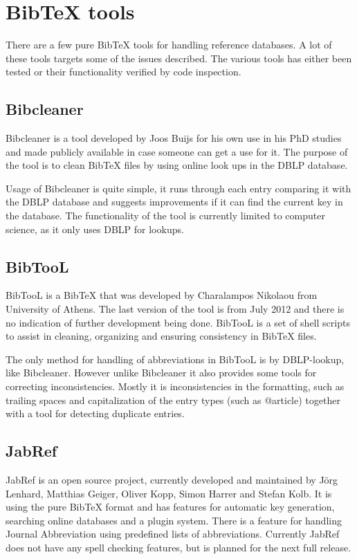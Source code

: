 \section{Bib{\TeX} tools}
\label{sec:bibtex_tools}
There are a few pure Bib{\TeX} tools for handling reference databases.
A lot of these tools targets some of the issues described.  The
various tools has either been tested or their functionality verified
by code inspection.

\subsection{Bibcleaner}
Bibcleaner is a tool developed by Joos Buijs for his own use in his
PhD studies and made publicly available in case someone can get a use
for it.  The purpose of the tool is to clean Bib{\TeX} files by using
online look ups in the DBLP database\cite{bibcleaner_question,
  bibcleaner_source}.

Usage of Bibcleaner is quite simple, it runs through each entry
comparing it with the DBLP database and suggests improvements if it
can find the current key in the database.  The functionality of the
tool is currently limited to computer science, as it only uses DBLP
for lookups\cite{bibcleaner_source}.

\subsection{BibTooL}
BibTooL is a Bib{\TeX} that was developed by Charalampos Nikolaou from
University of Athens.  The last version of the tool is from July 2012
and there is no indication of further development being done.  BibTooL
is a set of shell scripts to assist in cleaning, organizing and
ensuring consistency in Bib{\TeX} files\cite{bibtool_site}.

The only method for handling of abbreviations in BibTooL is by
DBLP-lookup, like Bibcleaner.  However unlike Bibcleaner it also
provides some tools for correcting inconsistencies.  Mostly it is
inconsistencies in the formatting, such as trailing spaces and
capitalization of the entry types (such as @article) together with a
tool for detecting duplicate entries.

\subsection{JabRef}
JabRef is an open source project, currently developed and maintained
by Jörg Lenhard, Matthias Geiger, Oliver Kopp, Simon Harrer and Stefan
Kolb\cite{jabref_developers}.  It is using the pure Bib{\TeX} format
and has features for automatic key generation, searching online
databases and a plugin system\cite{jabref_features}.  There is a
feature for handling Journal Abbreviation using predefined lists of
abbreviations\cite{jabref_abbreviations}.  Currently JabRef does not
have any spell checking features, but is planned for the next full
release\cite{jabref_spellchecker}.

